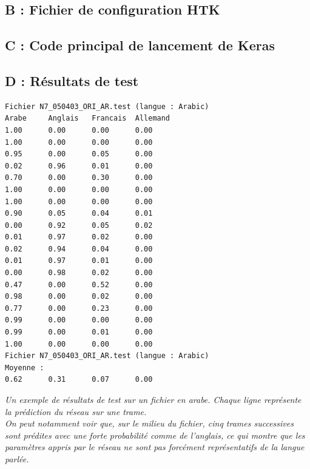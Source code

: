 \documentclass{article}
\begin{document}
\newpage

\subsection*{B : Fichier de configuration HTK}



\newpage

\subsection*{C : Code principal de lancement de Keras} 


\newpage

\subsection*{D : Résultats de test}

\begin{verbatim}
Fichier N7_050403_ORI_AR.test (langue : Arabic)
Arabe     Anglais   Francais  Allemand
1.00      0.00      0.00      0.00
1.00      0.00      0.00      0.00
0.95      0.00      0.05      0.00
0.02      0.96      0.01      0.00
0.70      0.00      0.30      0.00
1.00      0.00      0.00      0.00
1.00      0.00      0.00      0.00
0.90      0.05      0.04      0.01
0.00      0.92      0.05      0.02
0.01      0.97      0.02      0.00
0.02      0.94      0.04      0.00
0.01      0.97      0.01      0.00
0.00      0.98      0.02      0.00
0.47      0.00      0.52      0.00
0.98      0.00      0.02      0.00
0.77      0.00      0.23      0.00
0.99      0.00      0.00      0.00
0.99      0.00      0.01      0.00
1.00      0.00      0.00      0.00
Fichier N7_050403_ORI_AR.test (langue : Arabic)
Moyenne :
0.62      0.31      0.07      0.00
\end{verbatim}
\textit{Un exemple de résultats de test sur un fichier en arabe. Chaque ligne représente la prédiction du réseau sur une trame.\\ On peut notamment voir que, sur le milieu du fichier, cinq trames successives sont prédites avec une forte probabilité comme de l'anglais, ce qui montre que les paramètres appris par le réseau ne sont pas forcément représentatifs de la langue parlée.}
\end{document}

